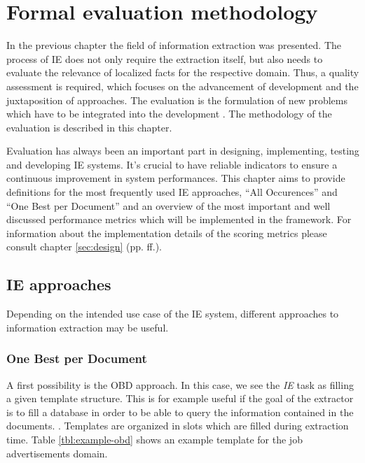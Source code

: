 \section{Formal evaluation methodology}
\label{sec:evaluation-methodology}

In the previous chapter the field of information extraction was presented. The process of IE does not only require the extraction itself, but also needs to evaluate the relevance of localized facts for the respective domain. Thus, a quality assessment is required, which focuses on the advancement of development and the juxtaposition of approaches. The evaluation is the formulation of new problems which have to be integrated into the development \cite{Linsmayr:2010}. The methodology of the evaluation is described in this chapter.

Evaluation has always been an important part in designing, implementing, testing and developing \gls{IE} systems. It's crucial to have reliable indicators to ensure a continuous improvement in system performances. This chapter aims to provide definitions for the most frequently used \gls{IE} approaches, \enquote{All Occurences} and \enquote{One Best per Document} and an overview of the most important and well discussed performance metrics which will be implemented in the framework. For information about the implementation details of the scoring metrics please consult chapter \ref{sec:design} (pp. \pageref{sec:design}ff.).

\newpage
\subsection{\gls{IE} approaches}
\label{sec:ie-approaches}
Depending on the intended use case of the IE system, different approaches to information extraction may be useful. 

\subsubsection{One Best per Document}A first possibility is the \gls{OBD} approach. In this case, we see the \textit{IE} task as filling a given template structure. This is for example useful if the goal of the extractor is to fill a database in order to be able to query the information contained in the documents. \cite{Sitter:2004}. Templates are organized in slots which are filled during extraction time. Table \ref{tbl:example-obd} shows an example template for the job advertisements domain.

